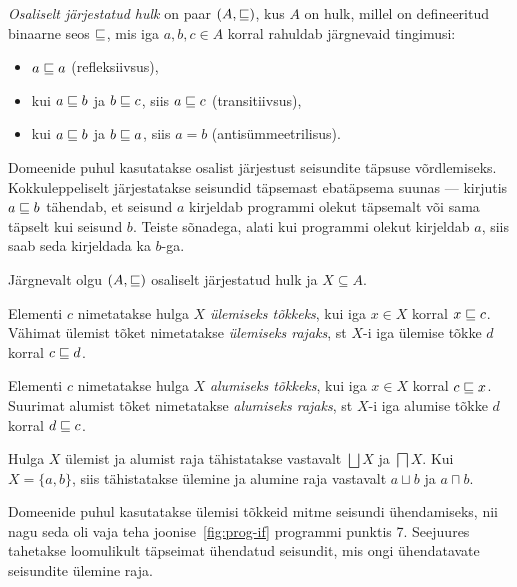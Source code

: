 \documentclass[../thesis.tex]{subfiles}
\begin{document}
\begin{definition}
\label{def:järjestatud_hulk}
\emph{Osaliselt järjestatud hulk} on paar $(A, \sqsubseteq)$, kus $A$ on hulk, millel on defineeritud binaarne seos $\sqsubseteq$, mis iga $a, b, c \in A$ korral rahuldab järgnevaid tingimusi:
\begin{itemize}[nosep]
	\item $a \sqsubseteq a$ (refleksiivsus),
	\item kui $a \sqsubseteq b$ ja $b \sqsubseteq c$, siis $a \sqsubseteq c$ (transitiivsus),
	\item kui $a \sqsubseteq b$ ja $b \sqsubseteq a$, siis $a = b$ (antisümmeetrilisus).
\end{itemize}
\end{definition}

Domeenide puhul kasutatakse osalist järjestust seisundite täpsuse võrdlemiseks. Kokkuleppeliselt järjestatakse seisundid täpsemast ebatäpsema suunas --- kirjutis $a \sqsubseteq b$ tähendab, et seisund $a$ kirjeldab programmi olekut täpsemalt või sama täpselt kui seisund $b$. Teiste sõnadega, alati kui programmi olekut kirjeldab $a$, siis saab seda kirjeldada ka $b$-ga.

\noindent
Järgnevalt olgu $(A, \sqsubseteq)$ osaliselt järjestatud hulk ja $X \subseteq A$.

\begin{definition}
\label{def:join}
Elementi $c$ nimetatakse hulga $X$ \emph{ülemiseks tõkkeks}, kui iga $x \in X$ korral $x \sqsubseteq c$. Vähimat ülemist tõket nimetatakse \emph{ülemiseks rajaks}, st $X$-i iga ülemise tõkke $d$ korral $c \sqsubseteq d$.
\end{definition}

\begin{definition}
\label{def:meet}
Elementi $c$ nimetatakse hulga $X$ \emph{alumiseks tõkkeks}, kui iga $x \in X$ korral $c \sqsubseteq x$. Suurimat alumist tõket nimetatakse \emph{alumiseks rajaks}, st $X$-i iga alumise tõkke $d$ korral $d \sqsubseteq c$.
\end{definition}

Hulga $X$ ülemist ja alumist raja tähistatakse vastavalt $\bigsqcup X$ ja $\bigsqcap X$. Kui $X = \{a, b\}$, siis tähistatakse ülemine ja alumine raja vastavalt $a \sqcup b$ ja $a \sqcap b$.

Domeenide puhul kasutatakse ülemisi tõkkeid mitme seisundi ühendamiseks, nii nagu seda oli vaja teha joonise~\ref{fig:prog-if} programmi punktis 7. Seejuures tahetakse loomulikult täpseimat ühendatud seisundit, mis ongi ühendatavate seisundite ülemine raja.
\end{document}
